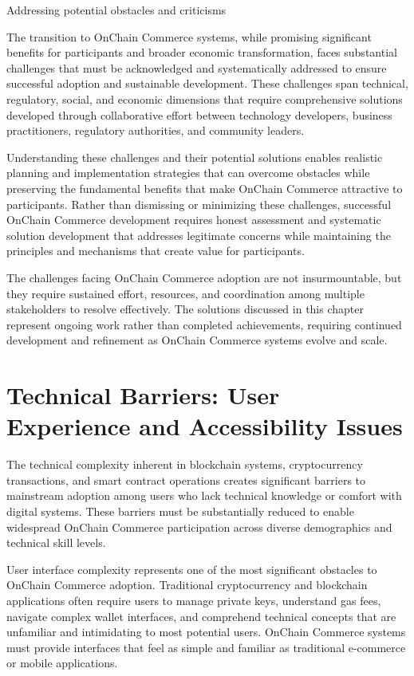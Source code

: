 \documentclass[
  Letterpaper,
]{scrbook}
\begin{document}
Addressing potential obstacles and criticisms

The transition to OnChain Commerce systems, while promising significant
benefits for participants and broader economic transformation, faces
substantial challenges that must be acknowledged and systematically
addressed to ensure successful adoption and sustainable development.
These challenges span technical, regulatory, social, and economic
dimensions that require comprehensive solutions developed through
collaborative effort between technology developers, business
practitioners, regulatory authorities, and community leaders.

Understanding these challenges and their potential solutions enables
realistic planning and implementation strategies that can overcome
obstacles while preserving the fundamental benefits that make OnChain
Commerce attractive to participants. Rather than dismissing or
minimizing these challenges, successful OnChain Commerce development
requires honest assessment and systematic solution development that
addresses legitimate concerns while maintaining the principles and
mechanisms that create value for participants.

The challenges facing OnChain Commerce adoption are not insurmountable,
but they require sustained effort, resources, and coordination among
multiple stakeholders to resolve effectively. The solutions discussed in
this chapter represent ongoing work rather than completed achievements,
requiring continued development and refinement as OnChain Commerce
systems evolve and scale.

\section{Technical Barriers: User Experience and Accessibility
Issues}\label{technical-barriers-user-experience-and-accessibility-issues}

The technical complexity inherent in blockchain systems, cryptocurrency
transactions, and smart contract operations creates significant barriers
to mainstream adoption among users who lack technical knowledge or
comfort with digital systems. These barriers must be substantially
reduced to enable widespread OnChain Commerce participation across
diverse demographics and technical skill levels.

User interface complexity represents one of the most significant
obstacles to OnChain Commerce adoption. Traditional cryptocurrency and
blockchain applications often require users to manage private keys,
understand gas fees, navigate complex wallet interfaces, and comprehend
technical concepts that are unfamiliar and intimidating to most
potential users. OnChain Commerce systems must provide interfaces that
feel as simple and familiar as traditional e-commerce or mobile
applications.
\end{document}
